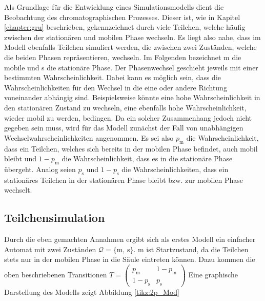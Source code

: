 Als Grundlage für die Entwicklung eines Simulationsmodells dient die Beobachtung des chromatographischen Prozesses. Dieser ist, wie in Kapitel \ref{chapter:gru} beschrieben, gekennzeichnet durch viele Teilchen, welche häufig zwischen der stationären und mobilen Phase wechseln. Es liegt also nahe, dass im Modell ebenfalls Teilchen simuliert werden, die zwischen zwei Zuständen, welche die beiden Phasen repräsentieren, wechseln. Im Folgenden bezeichnet m die mobile und s die stationäre Phase. Der Phasenwechsel geschieht jeweils mit einer bestimmten Wahrscheinlichkeit. Dabei kann es möglich sein, dass die Wahrscheinlichkeiten für den Wechsel in die eine oder andere Richtung voneinander abhängig sind. Beispielsweise könnte eine hohe Wahrscheinlichkeit in den stationären Zustand zu wechseln, eine ebenfalls hohe Wahrscheinlichkeit, wieder mobil zu werden, bedingen. Da ein solcher Zusammenhang jedoch nicht gegeben sein muss, wird für das Modell zunächst der Fall von unabhängigen Wechselwahrscheinlichkeiten angenommen. Es sei also $p_{\text {m}}$ die Wahrscheinlichkeit, dass ein Teilchen, welches sich bereits in der mobilen Phase befindet, auch mobil bleibt und $1-p_{\text {m}}$ die Wahrscheinlichkeit, dass es in die stationäre Phase übergeht. Analog seien $p_{\text {s}}$ und $1-p_{\text {s}}$ die Wahrscheinlichkeiten, dass ein stationäres Teilchen in der stationären Phase bleibt bzw. zur mobilen Phase wechselt. 

\subsection{Teilchensimulation}
Durch die eben gemachten Annahmen ergibt sich als erstes Modell ein einfacher Automat mit zwei Zuständen $\mathcal{Q} = \{\text{m, s}\}$. m ist Startzustand, da die Teilchen stets nur in der mobilen Phase in die Säule eintreten können. Dazu kommen die oben beschriebenen Transitionen $T= 
\begin{pmatrix}
p_{\text {m}} & 1-p_{\text {m}} \\
1-p_{\text {s}} & p_{\text {s}} 
\end{pmatrix}
$ 
Eine graphische Darstellung des Modells zeigt Abbildung \ref{tikz:2p_Mod} %

